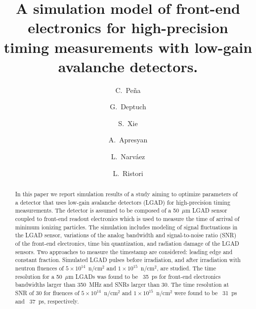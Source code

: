 \documentclass[preprint,1p]{elsarticle}
\begin{document}
\linenumbers

\begin{frontmatter}



\title{A simulation model of front-end electronics for high-precision timing measurements with low-gain avalanche detectors.}


\author[1,2]{C.~Pe\~na}
\author[1]{G.~Deptuch}
\author[2]{S.~Xie}
\author[1]{A.~Apresyan}
\author[2]{L.~Narv\'aez}
\author[1]{L.~Ristori}

\address[1]{Fermi National Accelerator Laboratory, Batavia, IL, USA}
\address[2]{California Institute of Technology, Pasadena, CA, USA}

\begin{abstract}
In this paper we report simulation results of a study aiming to optimize
parameters of a detector that uses low-gain avalanche detectors (LGAD) for
high-precision timing measurements. The detector is assumed to be composed of a
50~$\mu$m LGAD sensor coupled to front-end readout electronics which is used to
measure the time of arrival of minimum ionizing particles. The simulation
includes modeling of signal fluctuations in the LGAD sensor, variations of the analog
bandwidth and signal-to-noise ratio (SNR) of the front-end electronics, time
bin quantization, and radiation damage of the LGAD sensors. Two approaches to
measure the timestamp are considered: leading edge and constant fraction.
Simulated LGAD pulses before irradiation, and after irradiation with
neutron fluences of $5\times 10^{14}$~n/cm$^2$ and $1\times 10^{15}$~n/cm$^2$,
are studied. The time resolution for a 50~$\mu$m LGADs was found to be ~35~\si{ps}
for front-end electronics bandwidths larger than 350~\si{MHz} and SNRs larger
than 30. The time resolution at SNR of 30 for fluences of $5\times
10^{14}$~n/cm$^2$ and $1\times 10^{15}$~n/cm$^2$ were found to be ~31~\si{ps}
and ~37~\si{ps}, respectively.
\end{abstract}


\end{frontmatter}
\end{document}
